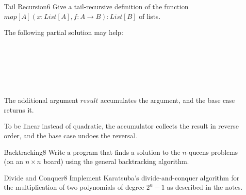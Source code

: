 \documentclass[a4paper]{article}
\begin{document}
\header

\begin{problem}{Tail Recursion}{6}
Give a tail-recursive definition of the function $map[A](x:List[A],f:A\to B):List[B]$ of lists.

The following partial solution may help:
\begin{acode}
\\
\\
\end{acode}


\begin{solution}
\begin{acode}
\\
\\
\end{acode}

The additional argument $result$ accumulates the argument, and the base case returns it.

To be linear instead of quadratic, the accumulator collects the result in reverse order, and the base case undoes the reversal.
\end{solution}
\end{problem}

\begin{problem}{Backtracking}{8}
Write a program that finds a solution to the $n$-queens problems (on an $n\times n$ board) using the general backtracking algorithm.
\end{problem}

\begin{problem}{Divide and Conquer}{8}
Implement Karatsuba's divide-and-conquer algorithm for the multiplication of two polynomials of degree $2^n-1$ as described in the notes.
\end{problem}
\end{document}
